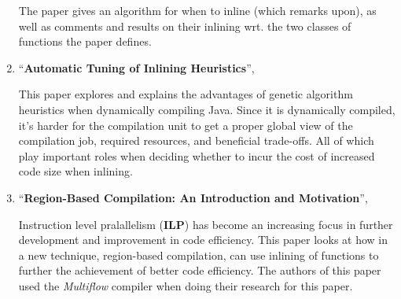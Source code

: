 \begin{enumerate}
The paper gives an algorithm for when to inline (which \cite{GHC-paper} remarks
upon), as well as comments and results on their inlining wrt. the two classes of
functions the paper defines.

	\item ``\textbf{Automatic Tuning of Inlining Heuristics}'',
\cite{AutoTuningJavaHeuristics}

This paper explores and explains the advantages of genetic algorithm  heuristics
when dynamically compiling Java. Since it is dynamically compiled, it's harder
for the compilation unit to get a proper global view of the compilation job,
required resources, and beneficial trade-offs. All of which play important roles
when deciding whether to incur the cost of increased code size when inlining.

	\item ``\textbf{Region-Based Compilation: An Introduction and Motivation}'',

Instruction level pralallelism (\textbf{ILP}) has become an increasing focus in
further development and improvement in code efficiency. This paper looks at how
in a new technique, region-based compilation, can use inlining of functions to
further the achievement of better code efficiency. The authors of this paper
used the \textit{Multiflow} compiler when doing their research for this paper.

\end{enumerate}
